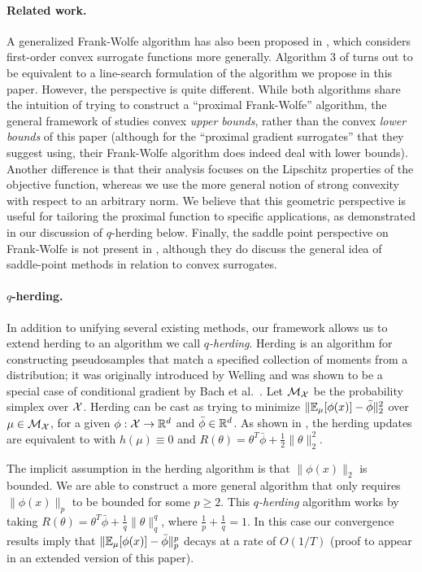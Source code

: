 \documentclass{article} %
\begin{document}
\paragraph{Related work.}
A generalized Frank-Wolfe algorithm has also been proposed in \cite{Mairal:2013}, 
which considers first-order convex surrogate functions more generally. Algorithm 3 
of \cite{Mairal:2013} turns out to be equivalent to a line-search formulation of the 
algorithm we propose in this paper. However, the perspective is quite different. 
While both algorithms share the intuition of trying to construct a ``proximal Frank-Wolfe'' 
algorithm, the general framework of \cite{Mairal:2013} studies convex \emph{upper bounds}, 
rather than the convex \emph{lower bounds} of this paper (although for the 
``proximal gradient surrogates'' that they suggest using, their Frank-Wolfe algorithm 
does indeed deal with lower bounds). Another difference is that their analysis focuses 
on the Lipschitz properties of the objective function, whereas we use the more general 
notion of strong convexity with respect to an arbitrary norm. We believe that this 
geometric perspective is useful for tailoring the proximal function to specific applications, 
as demonstrated in our discussion of $q$-herding below. Finally, the saddle point 
perspective on Frank-Wolfe is not present in \cite{Mairal:2013}, although they 
do discuss the general idea of saddle-point methods in relation to convex surrogates.



\paragraph{$q$-herding.}
In addition to unifying several existing methods, our framework allows us to 
extend herding to an algorithm we call \emph{$q$-herding}. Herding is 
an algorithm for constructing pseudosamples that match a specified collection 
of moments from a distribution; it was originally introduced by Welling 
\cite{Welling:2009a} and was shown to be a special case of conditional gradient 
by Bach et al.~\cite{Bach:2012a}. Let $\mathcal{M}_{\mathcal{X}}$ be the probability simplex over 
$\mathcal{X}$. Herding can be cast as trying to minimize 
$\|\mathbb{E}_{\mu}[\phi(x)]-\bar{\phi}\|_2^2$ over $\mu \in \mathcal{M}_{\mathcal{X}}$, for a
given $\phi : \mathcal{X} \to \mathbb{R}^d$ and $\bar{\phi} \in \mathbb{R}^d$. As shown in 
\cite{Bach:2012a}, the herding updates are equivalent to \dual with 
$h(\mu) \equiv 0$ and $R(\theta) = \theta^T\bar{\phi} + \frac{1}{2}\|\theta\|_2^2$.

The implicit assumption in the herding algorithm is that $\|\phi(x)\|_2$ is 
bounded. We are able to construct a more general algorithm that only requires 
$\|\phi(x)\|_p$ to be bounded for some $p \geq 2$. This \emph{$q$-herding} 
algorithm works by taking 
$R(\theta) = \theta^T\bar{\phi} + \frac{1}{q}\|\theta\|_q^q$, where 
$\frac{1}{p} + \frac{1}{q} = 1$. In this case our convergence results imply that 
$\|\mathbb{E}_{\mu}[\phi(x)]-\bar{\phi}\|_p^p$ decays at a rate of $O(1/T)$ (proof to 
appear in an extended version of this paper).
\end{document}
